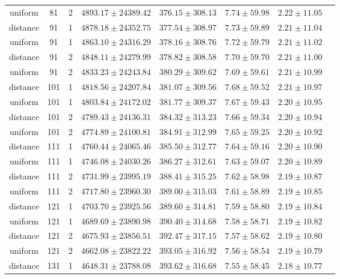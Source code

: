 \begin{tabular}{cccrrrrr}
uniform & 81 & 2 & $4893.17 \pm 24389.42$ & $376.15 \pm 308.13$ & $7.74 \pm 59.98$ & $2.22 \pm 11.05$\\
distance & 91 & 1 & $4878.18 \pm 24352.75$ & $377.54 \pm 308.97$ & $7.73 \pm 59.89$ & $2.21 \pm 11.04$\\
uniform & 91 & 1 & $4863.10 \pm 24316.29$ & $378.16 \pm 308.76$ & $7.72 \pm 59.79$ & $2.21 \pm 11.02$\\
distance & 91 & 2 & $4848.11 \pm 24279.99$ & $378.82 \pm 308.58$ & $7.70 \pm 59.70$ & $2.21 \pm 11.00$\\
uniform & 91 & 2 & $4833.23 \pm 24243.84$ & $380.29 \pm 309.62$ & $7.69 \pm 59.61$ & $2.21 \pm 10.99$\\
distance & 101 & 1 & $4818.56 \pm 24207.84$ & $381.07 \pm 309.56$ & $7.68 \pm 59.52$ & $2.21 \pm 10.97$\\
uniform & 101 & 1 & $4803.84 \pm 24172.02$ & $381.77 \pm 309.37$ & $7.67 \pm 59.43$ & $2.20 \pm 10.95$\\
distance & 101 & 2 & $4789.43 \pm 24136.31$ & $384.32 \pm 313.23$ & $7.66 \pm 59.34$ & $2.20 \pm 10.94$\\
uniform & 101 & 2 & $4774.89 \pm 24100.81$ & $384.91 \pm 312.99$ & $7.65 \pm 59.25$ & $2.20 \pm 10.92$\\
distance & 111 & 1 & $4760.44 \pm 24065.46$ & $385.50 \pm 312.77$ & $7.64 \pm 59.16$ & $2.20 \pm 10.90$\\
uniform & 111 & 1 & $4746.08 \pm 24030.26$ & $386.27 \pm 312.61$ & $7.63 \pm 59.07$ & $2.20 \pm 10.89$\\
distance & 111 & 2 & $4731.99 \pm 23995.19$ & $388.41 \pm 315.25$ & $7.62 \pm 58.98$ & $2.19 \pm 10.87$\\
uniform & 111 & 2 & $4717.80 \pm 23960.30$ & $389.00 \pm 315.03$ & $7.61 \pm 58.89$ & $2.19 \pm 10.85$\\
distance & 121 & 1 & $4703.70 \pm 23925.56$ & $389.60 \pm 314.81$ & $7.59 \pm 58.80$ & $2.19 \pm 10.84$\\
uniform & 121 & 1 & $4689.69 \pm 23890.98$ & $390.40 \pm 314.68$ & $7.58 \pm 58.71$ & $2.19 \pm 10.82$\\
distance & 121 & 2 & $4675.93 \pm 23856.51$ & $392.47 \pm 317.15$ & $7.57 \pm 58.62$ & $2.19 \pm 10.80$\\
uniform & 121 & 2 & $4662.08 \pm 23822.22$ & $393.05 \pm 316.92$ & $7.56 \pm 58.54$ & $2.19 \pm 10.79$\\
distance & 131 & 1 & $4648.31 \pm 23788.08$ & $393.62 \pm 316.68$ & $7.55 \pm 58.45$ & $2.18 \pm 10.77$\\

\end{tabular}
